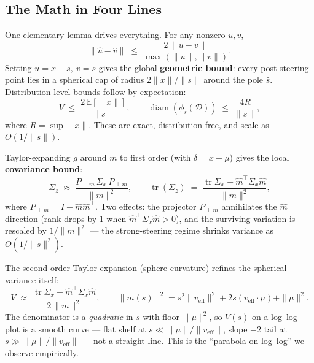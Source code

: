 \subsection{The Math in Four Lines}

One elementary lemma drives everything. For any nonzero $u, v$,
\begin{equation}
  \|\hat{u} - \hat{v}\| \;\le\; \frac{2\,\|u - v\|}{\max(\|u\|, \|v\|)}.
  \label{eq:ab-chordal}
\end{equation}
Setting $u = x+s,\ v = s$ gives the global \textbf{geometric bound}:
every post-steering point lies in a spherical cap of radius
$2\|x\|/\|s\|$ around the pole $\hat{s}$. Distribution-level bounds
follow by expectation:
\begin{equation}
  V \;\le\; \frac{2\,\mathbb{E}[\|x\|]}{\|s\|}, \qquad
  \operatorname{diam}(\phi_s(\mathcal{D})) \;\le\; \frac{4R}{\|s\|},
  \label{eq:ab-global}
\end{equation}
where $R = \sup \|x\|$. These are exact, distribution-free, and scale as
$O(1/\|s\|)$.

Taylor-expanding $g$ around $m$ to first order (with $\delta = x - \mu$)
gives the local \textbf{covariance bound}:
\begin{equation}
  \Sigma_z \;\approx\; \frac{P_{\perp m}\,\Sigma_x\,P_{\perp m}}{\|m\|^2},
  \qquad
  \operatorname{tr}(\Sigma_z) \;=\; \frac{\operatorname{tr}\Sigma_x - \hat{m}^\top\Sigma_x\hat{m}}{\|m\|^2},
  \label{eq:ab-local}
\end{equation}
where $P_{\perp m} = I - \hat{m}\hat{m}^\top$. Two effects: the projector
$P_{\perp m}$ annihilates the $\hat{m}$ direction (rank drops by 1 when
$\hat{m}^\top\Sigma_x\hat{m} > 0$), and the surviving variation is
rescaled by $1/\|m\|^2$ --- the strong-steering regime shrinks variance
as $O(1/\|s\|^2)$.

The second-order Taylor expansion (sphere curvature) refines the
spherical variance itself:
\begin{equation}
  V \;\approx\; \frac{\operatorname{tr}\Sigma_x - \hat{m}^\top\Sigma_x\hat{m}}{2\,\|m\|^2},
  \qquad
  \|m(s)\|^2 = s^2 \|v_{\mathrm{eff}}\|^2 + 2 s (v_{\mathrm{eff}} \cdot \mu) + \|\mu\|^2.
  \label{eq:ab-second-order}
\end{equation}
The denominator is a \emph{quadratic} in $s$ with floor $\|\mu\|^2$, so
$V(s)$ on a log--log plot is a smooth curve --- flat shelf at
$s \ll \|\mu\|/\|v_{\mathrm{eff}}\|$, slope $-2$ tail at
$s \gg \|\mu\|/\|v_{\mathrm{eff}}\|$ --- not a straight line. This is
the ``parabola on log--log'' we observe empirically.


